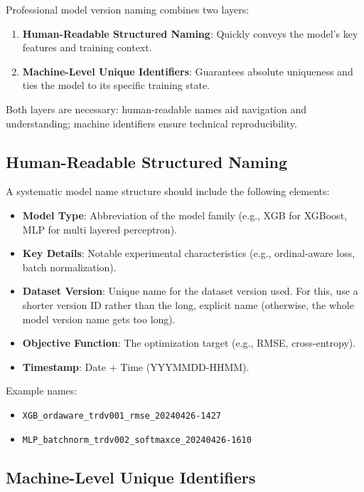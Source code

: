 \documentclass[12pt,openany]{book}
\begin{document}
Professional model version naming combines two layers:

\begin{enumerate}
    \item \textbf{Human-Readable Structured Naming}: Quickly conveys the model's key features and training context.
    \item \textbf{Machine-Level Unique Identifiers}: Guarantees absolute uniqueness and ties the model to its specific training state.
\end{enumerate}

Both layers are necessary: human-readable names aid navigation and understanding; machine identifiers ensure technical reproducibility.


\subsection{Human-Readable Structured Naming}
A systematic model name structure should include the following elements:

\begin{itemize}
    \item \textbf{Model Type}: Abbreviation of the model family (e.g., XGB for XGBoost, MLP for multi layered perceptron).
    \item \textbf{Key Details}: Notable experimental characteristics (e.g., ordinal-aware loss, batch normalization).
    \item \textbf{Dataset Version}: Unique name for the dataset version used. For this, use a shorter version ID rather than the long, explicit name (otherwise, the whole model version name gets too long).
    \item \textbf{Objective Function}: The optimization target (e.g., RMSE, cross-entropy).
    \item \textbf{Timestamp}: Date + Time (YYYMMDD-HHMM).
\end{itemize}

Example names:
\begin{itemize}
    \item \texttt{XGB\_ordaware\_trdv001\_rmse\_20240426-1427}
    \item \texttt{MLP\_batchnorm\_trdv002\_softmaxce\_20240426-1610}
\end{itemize}


\subsection{Machine-Level Unique Identifiers}
\end{document}
